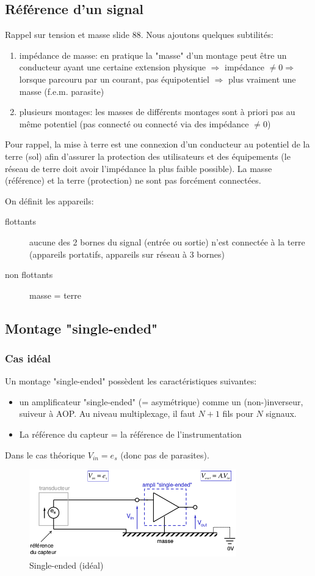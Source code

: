 \subsection{Référence d'un signal}
Rappel sur tension et masse slide 88. Nous ajoutons quelques subtilités:
\begin{enumerate}
	\item impédance de masse: en pratique la "masse" d'un montage peut être un conducteur ayant une certaine extension physique \(\Rightarrow\) impédance \(\neq 0 \Rightarrow\) lorsque parcouru par un courant, pas équipotentiel \(\Rightarrow\) plus vraiment une masse (f.e.m. parasite)
	\item plusieurs montages: les masses de différents montages sont à priori pas au même potentiel (pas connecté ou connecté via des impédance \(\neq 0\))
\end{enumerate}
Pour rappel, la mise à terre est une connexion d'un conducteur au potentiel de la terre (sol) afin d'assurer la protection des utilisateurs et des équipements (le réseau de terre doit avoir l'impédance la plus faible possible). La masse (référence) et la terre (protection) ne sont pas forcément connectées.\bigbreak

On définit les appareils:
\begin{description}
	\item[flottants] aucune des 2 bornes du signal (entrée ou sortie) n'est connectée à la terre (appareils portatifs, appareils sur réseau à 3 bornes)
	\item[non flottants] masse = terre
\end{description}
\subsection{Montage "single-ended"}
\subsubsection{Cas idéal}
Un montage "single-ended" possèdent les caractéristiques suivantes:
\begin{itemize}
\item un amplificateur "single-ended" (= asymétrique) comme un (non-)inverseur, suiveur à AOP. Au niveau multiplexage, il faut \(N+1\) fils pour \(N\) signaux. \item La référence du capteur = la référence de l'instrumentation
\end{itemize} 
Dans le cas théorique \(V_{in}=e_s\) (donc pas de parasites).
\begin{figure}[H] 
	\centering 
	\includegraphics[width=0.8\textwidth,height=10\baselineskip,keepaspectratio]{ch3/image11} 
	\caption{Single-ended (idéal)} 
\end{figure}
